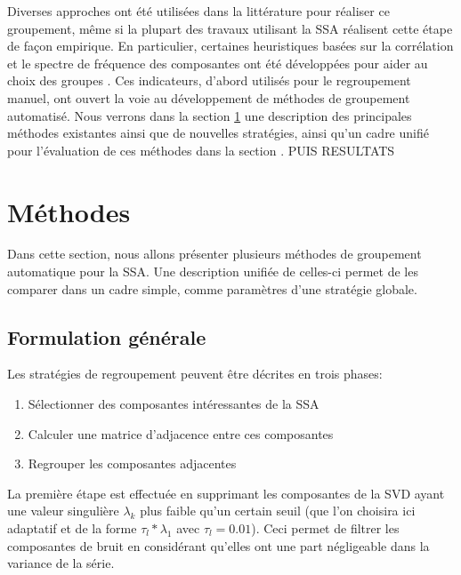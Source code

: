 \documentclass{gretsi}
\begin{document}
Diverses approches ont été utilisées dans la littérature pour réaliser ce groupement, même si la plupart des travaux utilisant la SSA réalisent cette étape de façon empirique. En particulier, certaines heuristiques basées sur la corrélation et le spectre de fréquence des composantes ont été développées pour aider au choix des groupes \cite{GNZ_10_SSA}. Ces indicateurs, d'abord utilisés pour le regroupement manuel, ont ouvert la voie au développement de méthodes de groupement automatisé. Nous verrons dans la section \ref{sec:met} une description des principales méthodes existantes ainsi que de nouvelles stratégies, ainsi qu'un cadre unifié pour l'évaluation de ces méthodes dans la section \label{sec:eval}. PUIS RESULTATS



\section{Méthodes}
\label{sec:met}

Dans cette section, nous allons présenter plusieurs méthodes de groupement automatique pour la SSA. Une description unifiée de celles-ci permet de les comparer dans un cadre simple, comme paramètres d'une stratégie globale.

\subsection{Formulation générale}
\label{sub:form}

Les stratégies de regroupement peuvent être décrites en trois phases:
\begin{enumerate}
	\item Sélectionner des composantes intéressantes de la SSA
	\item Calculer une matrice d'adjacence entre ces composantes
	\item Regrouper les composantes adjacentes
\end{enumerate}
La première étape est effectuée en supprimant les composantes de la SVD ayant une valeur singulière $\lambda_k$ plus faible qu'un certain seuil (que l'on choisira ici adaptatif et de la forme  $\tau_l*\lambda_1$ avec $\tau_l = 0.01$). Ceci permet de filtrer les composantes de bruit en considérant qu'elles ont une part négligeable dans la variance de la série. 
\end{document}
